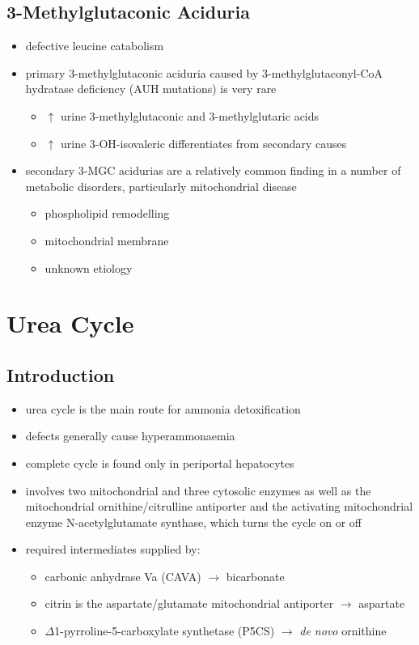 \documentclass{scrartcl}
\begin{document}
\subsection{3-Methylglutaconic Aciduria}
\label{sec:org1847415}
\begin{itemize}
\item defective leucine catabolism
\item primary 3-methylglutaconic aciduria caused by 3-methylglutaconyl-CoA
hydratase deficiency (AUH mutations) is very rare
\begin{itemize}
\item \(\uparrow\) urine 3-methylglutaconic and 3-methylglutaric acids
\item \(\uparrow\) urine 3-OH-isovaleric differentiates from secondary causes
\end{itemize}
\item secondary 3-MGC acidurias are a relatively common finding in a
number of metabolic disorders, particularly mitochondrial disease
\begin{itemize}
\item phospholipid remodelling
\item mitochondrial membrane
\item unknown etiology
\end{itemize}
\end{itemize}

\section{Urea Cycle}
\label{sec:orgbea780e}
\subsection{Introduction}
\label{sec:org0b1dec6}
\begin{itemize}
\item urea cycle is the main route for ammonia detoxification
\item defects generally cause hyperammonaemia
\item complete cycle is found only in periportal hepatocytes
\item involves two mitochondrial and three cytosolic enzymes as well as
the mitochondrial ornithine/citrulline antiporter and the activating
mitochondrial enzyme N-acetylglutamate synthase, which turns the
cycle on or off
\item required intermediates supplied by:
\begin{itemize}
\item carbonic anhydrase Va (CAVA) \(\to\) bicarbonate
\item citrin is the aspartate/glutamate mitochondrial antiporter  \(\to\) aspartate
\item \(\Delta\)1-pyrroline-5-carboxylate synthetase (P5CS) \(\to\) \emph{de novo} ornithine
\end{itemize}
\end{itemize}
\end{document}
